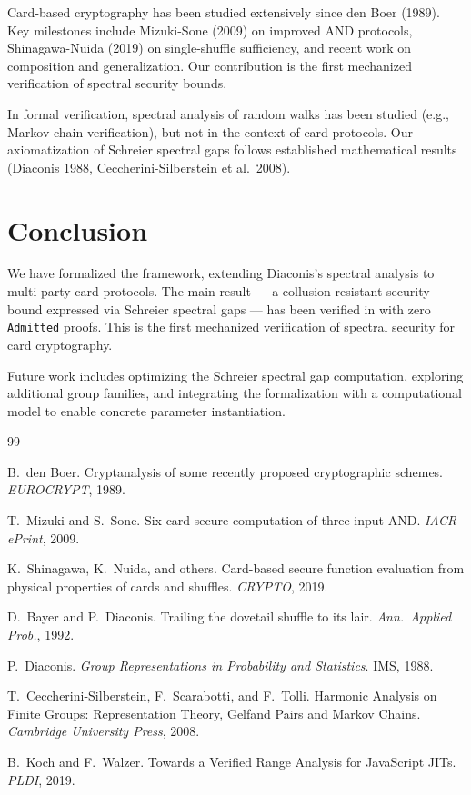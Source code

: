 \documentclass[11pt,a4paper]{article}
\begin{document}
Card-based cryptography has been studied extensively since den Boer (1989).
Key milestones include Mizuki-Sone (2009) on improved AND protocols, Shinagawa-Nuida (2019) on single-shuffle sufficiency, and recent work on composition and generalization.
Our contribution is the first mechanized verification of spectral security bounds.

In formal verification, spectral analysis of random walks has been studied (e.g., Markov chain verification), but not in the context of card protocols.
Our axiomatization of Schreier spectral gaps follows established mathematical results (Diaconis 1988, Ceccherini-Silberstein et al.\ 2008).

\section{Conclusion}
\label{sec:conclusion}

We have formalized the \pgg framework, extending Diaconis's spectral analysis to multi-party card protocols.
The main result — a collusion-resistant security bound expressed via Schreier spectral gaps — has been verified in \Rocq with zero \texttt{Admitted} proofs.
This is the first mechanized verification of spectral security for card cryptography.

Future work includes optimizing the Schreier spectral gap computation, exploring additional group families, and integrating the formalization with a computational model to enable concrete parameter instantiation.

\begin{thebibliography}{99}

B.\ den Boer.
Cryptanalysis of some recently proposed cryptographic schemes.
\textit{EUROCRYPT}, 1989.

T.\ Mizuki and S.\ Sone.
Six-card secure computation of three-input AND.
\textit{IACR ePrint}, 2009.

K.\ Shinagawa, K.\ Nuida, and others.
Card-based secure function evaluation from physical properties of cards and shuffles.
\textit{CRYPTO}, 2019.

D.\ Bayer and P.\ Diaconis.
Trailing the dovetail shuffle to its lair.
\textit{Ann.\ Applied Prob.}, 1992.

P.\ Diaconis.
\textit{Group Representations in Probability and Statistics}.
IMS, 1988.

T.\ Ceccherini-Silberstein, F.\ Scarabotti, and F.\ Tolli.
Harmonic Analysis on Finite Groups: Representation Theory, Gelfand Pairs and Markov Chains.
\textit{Cambridge University Press}, 2008.

B.\ Koch and F.\ Walzer.
Towards a Verified Range Analysis for JavaScript JITs.
\textit{PLDI}, 2019.

\end{thebibliography}
\end{document}
